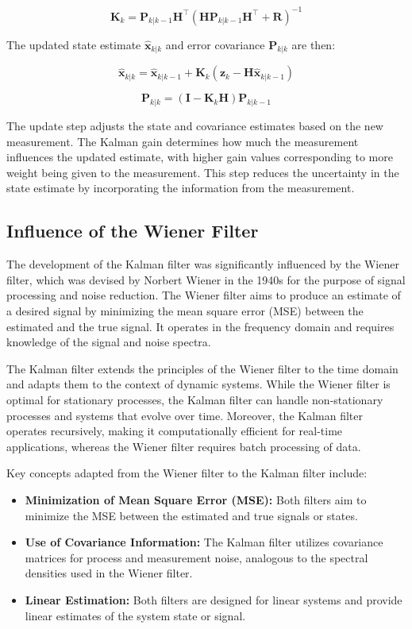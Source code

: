 \documentclass[conference]{IEEEtran}
\begin{document}
\[
    \mathbf{K}_k = \mathbf{P}_{k|k-1} \mathbf{H}^\top (\mathbf{H} \mathbf{P}_{k|k-1} \mathbf{H}^\top + \mathbf{R})^{-1}
\]

The updated state estimate \( \hat{\mathbf{x}}_{k|k} \) and error covariance \( \mathbf{P}_{k|k} \) are then:

\[
    \hat{\mathbf{x}}_{k|k} = \hat{\mathbf{x}}_{k|k-1} + \mathbf{K}_k (\mathbf{z}_k - \mathbf{H} \hat{\mathbf{x}}_{k|k-1})
\]

\[
    \mathbf{P}_{k|k} = (\mathbf{I} - \mathbf{K}_k \mathbf{H}) \mathbf{P}_{k|k-1}
\]

The update step adjusts the state and covariance estimates based on the new measurement. The Kalman
gain determines how much the measurement influences the updated estimate, with higher gain values
corresponding to more weight being given to the measurement. This step reduces the uncertainty in
the state estimate by incorporating the information from the measurement.

\subsection{Influence of the Wiener Filter}

The development of the Kalman filter was significantly influenced by the Wiener filter, which was
devised by Norbert Wiener in the 1940s for the purpose of signal processing and noise reduction.
The Wiener filter aims to produce an estimate of a desired signal by minimizing the mean square
error (MSE) between the estimated and the true signal. It operates in the frequency domain and
requires knowledge of the signal and noise spectra.

The Kalman filter extends the principles of the Wiener filter to the time domain and adapts them to
the context of dynamic systems. While the Wiener filter is optimal for stationary processes, the
Kalman filter can handle non-stationary processes and systems that evolve over time. Moreover, the
Kalman filter operates recursively, making it computationally efficient for real-time applications,
whereas the Wiener filter requires batch processing of data.

Key concepts adapted from the Wiener filter to the Kalman filter include:

\begin{itemize}
    \item \textbf{Minimization of Mean Square Error (MSE):} Both filters aim to minimize the MSE
          between the estimated and true signals or states.
    \item \textbf{Use of Covariance Information:} The Kalman filter utilizes covariance matrices for
          process and measurement noise, analogous to the spectral densities used in the Wiener filter.
    \item \textbf{Linear Estimation:} Both filters are designed for linear systems and provide
          linear estimates of the system state or signal.
\end{itemize}
\end{document}
